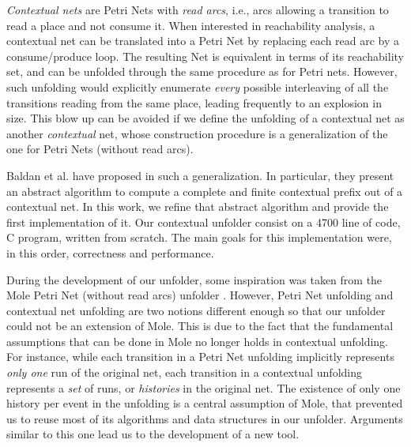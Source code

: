 \documentclass[11pt,a4paper]{article}
\begin{document}
\emph{Contextual nets} are Petri Nets with \emph{read arcs}, i.e., arcs
allowing a transition to read a place and not consume it.  When interested in
reachability analysis, a contextual net can be translated into a Petri Net by
replacing each read arc by a consume/produce loop.  The resulting Net is
equivalent in terms of its reachability set, and can be unfolded through the
same procedure as for Petri nets.  However, such unfolding would explicitly
enumerate \emph{every} possible interleaving of all the transitions reading
from the same place, leading frequently to an explosion in size.  This blow up
can be avoided if we define the unfolding of a contextual net as another
\emph{contextual} net, whose construction procedure is a generalization of the
one for Petri Nets (without read arcs).

Baldan et al. have proposed in  such a generalization.  In
particular, they present an abstract algorithm to compute a complete and finite
contextual prefix out of a contextual net.  In this work, we refine that
abstract algorithm and provide the first implementation of it.  Our contextual
unfolder consist on a 4700 line of code, C program, written from scratch.  The
main goals for this implementation were, in this order, correctness and
performance.

During the development of our unfolder, some inspiration was taken from the
Mole Petri Net (without read arcs) unfolder .  However, Petri Net
unfolding and contextual net unfolding are two notions different enough so that
our unfolder could not be an extension of Mole.  This is due to the fact that
the fundamental assumptions that can be done in Mole no longer holds in
contextual unfolding.  For instance, while each transition in a Petri Net
unfolding implicitly represents \emph{only one} run of the original net, each
transition in a contextual unfolding represents a \emph{set} of runs, or
\emph{histories} in the original net.  The existence of only one history per
event in the unfolding is a central assumption of Mole, that prevented us to
reuse most of its algorithms and data structures in our unfolder.  Arguments
similar to this one lead us to the development of a new tool.
\end{document}
